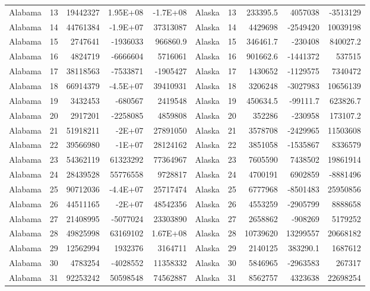 \begin{landscape}
\begin{singlespace}
\begin{longtable}{lrrrr|lrrrr}
		Alabama &  13 & 19442327 & 1.95E+08 & -1.7E+08 & Alaska &  13 & 233395.5 & 4057038 & -3513129 \\
		Alabama &  14 & 44761384 & -1.9E+07 & 37313087 & Alaska &  14 & 4429698 & -2549420 & 10039198 \\
		Alabama &  15 & 2747641 & -1936033 & 966860.9 & Alaska &  15 & 346461.7 & -230408 & 840027.2 \\
		Alabama &  16 & 4824719 & -6666604 & 5716061 & Alaska &  16 & 901662.6 & -1441372 & 537515 \\
		Alabama &  17 & 38118563 & -7533871 & -1905427 & Alaska &  17 & 1430652 & -1129575 & 7340472 \\
		Alabama &  18 & 66914379 & -4.5E+07 & 39410931 & Alaska &  18 & 3206248 & -3027983 & 10656139 \\
		Alabama &  19 & 3432453 & -680567 & 2419548 & Alaska &  19 & 450634.5 & -99111.7 & 623826.7 \\
		Alabama &  20 & 2917201 & -2258085 & 4859808 & Alaska &  20 & 352286 & -230958 & 173107.2 \\
		Alabama &  21 & 51918211 & -2E+07 & 27891050 & Alaska &  21 & 3578708 & -2429965 & 11503608 \\
		Alabama &  22 & 39566980 & -1E+07 & 28124162 & Alaska &  22 & 3851058 & -1535867 & 8336579 \\
		Alabama &  23 & 54362119 & 61323292 & 77364967 & Alaska &  23 & 7605590 & 7438502 & 19861914 \\
		Alabama &  24 & 28439528 & 55776558 & 9728817 & Alaska &  24 & 4700191 & 6902859 & -8881496 \\
		Alabama &  25 & 90712036 & -4.4E+07 & 25717474 & Alaska &  25 & 6777968 & -8501483 & 25950856 \\
		Alabama &  26 & 44511165 & -2E+07 & 48542356 & Alaska &  26 & 4553259 & -2905799 & 8888658 \\
		Alabama &  27 & 21408995 & -5077024 & 23303890 & Alaska &  27 & 2658862 & -908269 & 5179252 \\
		Alabama &  28 & 49825998 & 63169102 & 1.67E+08 & Alaska &  28 & 10739620 & 13299557 & 20668182 \\
		Alabama &  29 & 12562994 & 1932376 & 3164711 & Alaska &  29 & 2140125 & 383290.1 & 1687612 \\
		Alabama &  30 & 4783254 & -4028552 & 11358332 & Alaska &  30 & 5846965 & -2963583 & 267317 \\
		Alabama &  31 & 92253242 & 50598548 & 74562887 & Alaska &  31 & 8562757 & 4323638 & 22698254 \\

\end{longtable}
\end{singlespace}
\end{landscape}

